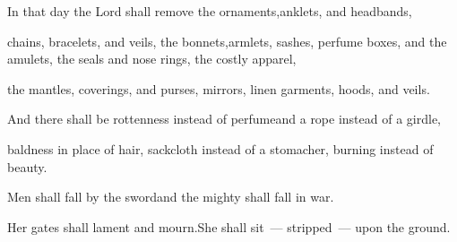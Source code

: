 \begin{inparaenum}
  \pa{} In that day the Lord shall remove the ornaments,\pa{}anklets, and headbands,%

  \pa{} chains, bracelets, and veils,  the bonnets,\pa{}armlets, sashes, perfume boxes, and the amulets,  the seals and nose rings,  the costly apparel,%

  \pb{}the mantles, coverings, and purses,  mirrors, linen garments, hoods, and veils.%

  \pa{} And there shall be rottenness instead of perfume\pa{}and a rope instead of a girdle,%

  \pb{}baldness in place of hair, sackcloth instead of a stomacher, burning instead of beauty.%

  \pa{} Men shall fall by the sword\pa{}and the mighty shall fall in war.%

  \pa{} Her gates shall lament and mourn.\pa{}She shall sit~--- stripped~--- upon the ground.%
\end{inparaenum}
